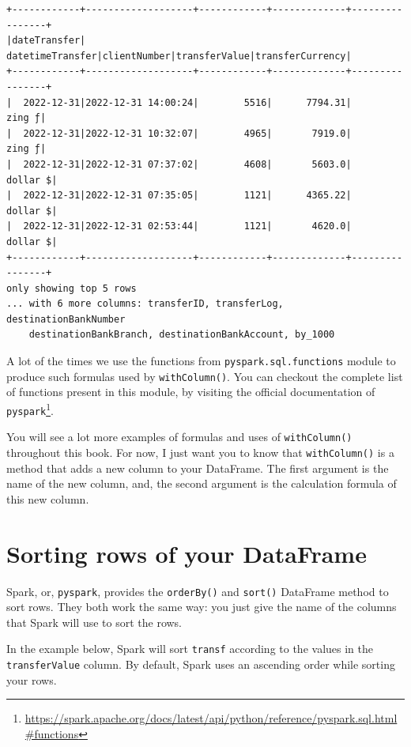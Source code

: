 \documentclass[
  11pt,
  letterpaper,
  DIV=11,
  numbers=noendperiod]{scrreprt}
\begin{document}
\begin{verbatim}
+------------+-------------------+------------+-------------+----------------+
|dateTransfer|   datetimeTransfer|clientNumber|transferValue|transferCurrency|
+------------+-------------------+------------+-------------+----------------+
|  2022-12-31|2022-12-31 14:00:24|        5516|      7794.31|          zing ƒ|
|  2022-12-31|2022-12-31 10:32:07|        4965|       7919.0|          zing ƒ|
|  2022-12-31|2022-12-31 07:37:02|        4608|       5603.0|        dollar $|
|  2022-12-31|2022-12-31 07:35:05|        1121|      4365.22|        dollar $|
|  2022-12-31|2022-12-31 02:53:44|        1121|       4620.0|        dollar $|
+------------+-------------------+------------+-------------+----------------+
only showing top 5 rows
... with 6 more columns: transferID, transferLog, destinationBankNumber
    destinationBankBranch, destinationBankAccount, by_1000
\end{verbatim}

A lot of the times we use the functions from
\texttt{pyspark.sql.functions} module to produce such formulas used by
\texttt{withColumn()}. You can checkout the complete list of functions
present in this module, by visiting the official documentation of
\texttt{pyspark}\footnote{\url{https://spark.apache.org/docs/latest/api/python/reference/pyspark.sql.html\#functions}}.

You will see a lot more examples of formulas and uses of
\texttt{withColumn()} throughout this book. For now, I just want you to
know that \texttt{withColumn()} is a method that adds a new column to
your DataFrame. The first argument is the name of the new column, and,
the second argument is the calculation formula of this new column.

\hypertarget{sorting-rows-of-your-dataframe}{%
\section{Sorting rows of your
DataFrame}\label{sorting-rows-of-your-dataframe}}

Spark, or, \texttt{pyspark}, provides the \texttt{orderBy()} and
\texttt{sort()} DataFrame method to sort rows. They both work the same
way: you just give the name of the columns that Spark will use to sort
the rows.

In the example below, Spark will sort \texttt{transf} according to the
values in the \texttt{transferValue} column. By default, Spark uses an
ascending order while sorting your rows.
\end{document}
